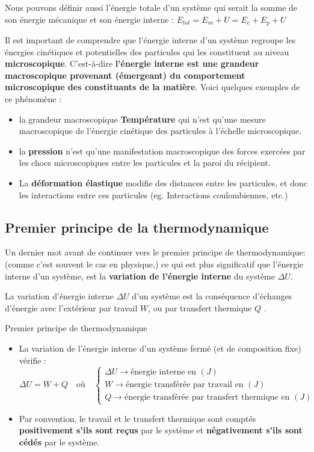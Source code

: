\documentclass[11pt,a4paper]{article}
\begin{document}
Nous pouvons définir aussi l'énergie totale d'un système qui serait la somme de son énergie mécanique et son énergie interne : $E_{tot} = E_m + U = E_c + E_p + U$

\begin{rmrq}
Il est important de comprendre que l’énergie interne d’un système regroupe les énergies cinétiques et potentielles des particules qui les constituent au niveau \textbf{microscopique}.  C'est-à-dire \textbf{l’énergie interne est une grandeur macroscopique provenant (émergeant) du comportement microscopique des constituants de la matière}.  Voici quelques exemples de ce phénomène :
\begin{itemize}
    \item la grandeur macroscopique \textbf{Température} qui n’est qu’une mesure macroscopique de l’énergie cinétique des particules à l’échelle microscopique.
    \item la \textbf{pression} n’est qu’une manifestation macroscopique des forces exercées par les chocs microscopiques entre les particules et la paroi du récipient.
    \item La \textbf{déformation élastique} modifie des distances entre les particules, et donc les interactions entre ces particules (eg. Interactions coulombiennes, etc.)
\end{itemize}
\end{rmrq}

\subsection{Premier principe de la thermodynamique}

Un dernier mot avant de continuer vers le premier principe de thermodynamique: (comme c'est souvent le cas en physique,) ce qui est plus significatif que l'énergie interne d'un système, est la \textbf{variation de l'énergie interne} du système $\Delta U$. 

La variation d’énergie interne $\Delta U$ d’un système est la conséquence d’échanges d’énergie avec l’extérieur par travail $W$, ou par transfert thermique $Q$ . 

\begin{defn}{Premier principe de thermodynamique}
\begin{itemize}
    \item La variation de l'énergie interne d'un système fermé (et de composition fixe) vérifie : 
\[  \Delta U = W + Q   \quad \text{où} \quad 
\begin{cases}
    \Delta U \rightarrow \text{énergie interne en }(J) \\
    W \rightarrow \text{énergie transférée par travail en }(J) \\ 
    Q \rightarrow \text{énergie transférée par transfert thermique en }(J)
\end{cases}\]
    \item Par convention, le travail et le transfert thermique sont comptés \textbf{positivement s’ils sont reçus} par le système et \textbf{négativement s’ils sont cédés} par le système. 
\end{itemize}
\end{defn}
\end{document}

